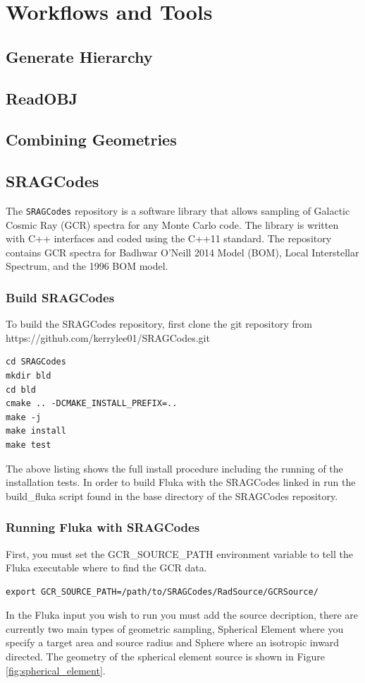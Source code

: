 \clearpage
\section{Workflows and Tools}

\subsection{Generate Hierarchy}

\subsection{ReadOBJ}

\subsection{Combining Geometries}

\subsection{SRAGCodes}
The \texttt{SRAGCodes} repository is a software library that allows sampling of Galactic Cosmic Ray (GCR)
spectra for any Monte Carlo code. The library is written with C++ interfaces and coded using the C++11 
standard. The repository contains GCR spectra for Badhwar O'Neill 2014 Model (BOM), Local Interstellar Spectrum, and
the 1996 BOM model.

\subsubsection*{Build SRAGCodes}
To build the SRAGCodes repository, first clone the git repository from https://github.com/kerrylee01/SRAGCodes.git
\lstset{language=bash} 
\begin{lstlisting}
cd SRAGCodes
mkdir bld
cd bld
cmake .. -DCMAKE_INSTALL_PREFIX=..
make -j
make install
make test
\end{lstlisting}
The above listing shows the full install procedure including the running of the installation tests. In order to build
Fluka with the SRAGCodes linked in run the build\_fluka script found in the base directory of the SRAGCodes repository.
\subsubsection*{Running Fluka with SRAGCodes}
First, you must set the GCR\_SOURCE\_PATH environment variable to tell the Fluka executable where to find the GCR data. 
\begin{lstlisting}
export GCR_SOURCE_PATH=/path/to/SRAGCodes/RadSource/GCRSource/
\end{lstlisting}
In the Fluka input you wish to run you must add the source decription, there are currently two main types of 
geometric sampling, Spherical Element where you specify a target area and source radius and Sphere where an isotropic
inward directed. The geometry of the spherical element source is shown in Figure \ref{fig:spherical_element}.

